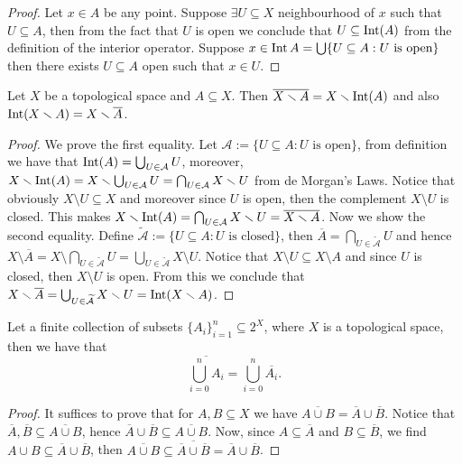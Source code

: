 \begin{proof}
  Let \(x \in A\) be any point. Suppose \(\exists U \subseteq X\) neighbourhood
  of \(x\) such that \(U \subseteq A\), then from the fact that \(U\) is open we
  conclude that \(U \subseteq \operatorname{Int}(A)\) from the definition of the interior
  operator. Suppose \(x \in \operatorname{Int} A = \bigcup \{U \subseteq A : U \text{ is
  open}\}\) then there exists \(U \subseteq A\) open such that \(x \in U\).
\end{proof}

\begin{proposition}
  Let \(X\) be a topological space and \(A \subseteq X\). Then \(\overline{X
  \smallsetminus A} = X \smallsetminus \operatorname{Int}(A)\) and also \(\operatorname{Int}(X \smallsetminus A) =
  X \smallsetminus \overline A\).
\end{proposition}

\begin{proof}
  We prove the first equality. Let \(\mathcal A := \{U \subseteq A : U \text{ is
  open}\}\), from definition we have that \(\operatorname{Int}(A) = \bigcup_{U \in \mathcal A}
  U\), moreover, \(X \smallsetminus \operatorname{Int}(A) = X \smallsetminus \bigcup_{U \in \mathcal A}
  U = \bigcap_{U \in \mathcal A} X \smallsetminus U\) from de Morgan's Laws. Notice
  that obviously \(X \setminus U \subseteq X\) and moreover since \(U\) is open,
  then the complement \(X \setminus U\) is closed. This makes \(X \smallsetminus
  \operatorname{Int}(A) = \bigcap_{U \in \mathcal A} X \smallsetminus U = \overline{X \smallsetminus
  A}\). Now we show the second equality. Define \(\mathcal{\widetilde A} := \{U
  \subseteq A : U \text{ is closed}\}\), then \(\overline A = \bigcap_{U \in
  \mathcal{\widetilde A}} U\) and hence \(X \setminus \overline A = X \setminus
  \bigcap_{U \in \mathcal{\widetilde A}} U = \bigcup_{U \in \mathcal{\widetilde
  A}} X \setminus U\). Notice that \(X\setminus U \subseteq X \setminus A\) and
  since \(U\) is closed, then \(X \setminus U\) is open. From this we conclude
  that \(X \smallsetminus \overline A = \bigcup_{U \in \mathcal{\widetilde A}} X
  \smallsetminus U = \operatorname{Int}(X \smallsetminus A)\).
\end{proof}

\begin{proposition}\label{prop: finite union of closures}
  Let a finite collection of subsets \(\{A_i\}_{i = 1}^n \subseteq 2^X\), where
  \(X\) is a topological space, then we have that
  \[
    \overline{\bigcup_{i = 0}^n A_i} = \bigcup_{i = 0}^n \overline{A_i}.
  \] 
\end{proposition}

\begin{proof}
  It suffices to prove that for \(A, B \subseteq X\) we have \(\overline{A \cup
  B} = \overline A \cup \overline B\). Notice that \(\overline A,
  \overline B \subseteq \overline{A \cup B}\), hence \(\overline A \cup
  \overline B \subseteq \overline{A \cup B}\). Now, since \(A \subseteq
  \overline A\) and \(B \subseteq \overline B\), we find \(A \cup B \subseteq
  \overline A \cup \overline B\), then \(\overline{A \cup B} \subseteq
  \overline{\overline A \cup \overline B} = \overline A \cup \overline B\).
\end{proof}

